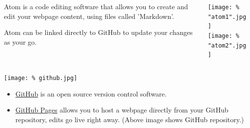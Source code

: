 \documentclass[unknownkeysallowed,usepdftitle=false, aspectratio=169, parskip=full]{beamer}
\newcommand{\secvariable}{nothing}
\newcommand{\mysection}[1]{\renewcommand{\secvariable}{#1}
}
\begin{document}
\mysection{radar}
\begin{frame}\label{\secvariable}
  \begin{columns}[t]
    \begin{column}[c]{0.45\textwidth}
    \parbox{\linewidth}{

      Atom is a code editing software that allows you to create and edit your webpage content, using files called 'Markdown'.
      
      \vspace{12pt}
      
	  Atom can be linked directly to GitHub to update your changes as your go. 
      }
    \end{column}
    \begin{column}[c]{0.45\textwidth}
\texttt{[image: \%
"atom1".jpg]}\\
\vspace{12pt}
\texttt{[image: \%
"atom2".jpg]}
    \end{column}
  \end{columns}

  
\end{frame}

\mysection{line}
\begin{frame}\label{\secvariable}
\begin{center}
  \vspace{-0.5cm}
 \texttt{[image: \%
  github.jpg]}
\end{center}
  \vspace{-0.5cm}
  
  
  
\begin{itemize}
\item \href{https://github.com/}{GitHub} is an open source version control software.
\item \href{https://pages.github.com/}{GitHub Pages} allows you to host a webpage directly from your GitHub repository, edits go live right away. (Above image shows GitHub repository.)
\end{itemize}

  
\end{frame}
\end{document}
